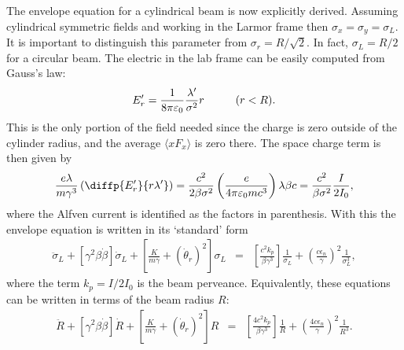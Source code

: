 The envelope equation for a cylindrical beam is now explicitly derived. Assuming
cylindrical symmetric fields and working in the Larmor frame then $\sigma_x
= \sigma_y = \sigma_L$. It is important to distinguish this parameter from $
\sigma_r = R/\sqrt{2}$. In fact, $\sigma_L = R/2$ for a circular beam. The
electric in the lab frame can be easily computed from Gauss's law:
%
\begin{eqnarray}
E_r\primed = \frac{1}{8\pi\epsilon_0}\frac{\lambda\primed}{\sigma^2}r  \hspace{1cm} (r<R).
\end{eqnarray}
%
This is the only portion of the field needed since the charge is zero outside of
the cylinder radius, and the average $\langle xF_x\rangle$ is zero there. The
space charge term is then given by
%
\begin{eqnarray}
\frac{e\lambda}{m\gamma^3}\left(\diffp{E_r\primed}{{r}{\lambda\primed}}\right)
=\frac{c^2}{2\beta\sigma^2}\left(\frac{e}{4\pi\epsilon_0mc^3}\right)\lambda\beta c = \frac{c^2}{\beta\sigma^2}\frac{I}{2I_0},
\end{eqnarray}
%
where the Alfven current is identified as the factors in parenthesis. With this
the envelope equation is written in its `standard' form \cite{bib:JBong}
%
\begin{eqnarray}
\ddot\sigma_L + \left[\gamma^2\beta\dot\beta\right]\dot\sigma_L + \left[\frac{K}{m\gamma}+(\dot\theta_r)^2\right]\sigma_L &=&
\left[\frac{c^2k_p}{\beta \gamma^3}\right]\frac{1}{\sigma_L}+\left(\frac{c\epsilon_n}{\gamma}\right)^2\frac{1}{\sigma_L^3},
\nonumber
\end{eqnarray}
%
where the term $k_p = I/2I_0$ is the beam perveance. Equivalently, these
equations can be written in terms of the beam radius $R$:
%
\begin{eqnarray}
\ddot R + \left[\gamma^2\beta\dot\beta\right]\dot R + \left[\frac{K}{m\gamma}+(\dot\theta_r)^2\right]R&=&
\left[\frac{4c^2k_p}{\beta \gamma^3}\right]\frac{1}{R}+\left(\frac{4c\epsilon_n}{\gamma}\right)^2\frac{1}{R^3}.
\end{eqnarray}

